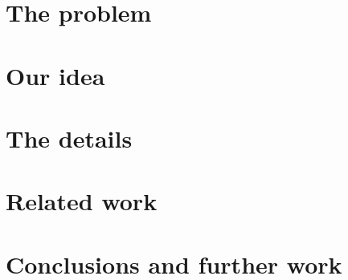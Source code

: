 \section{The problem}  %
  
\section{Our idea}     %
\section{The details}  %
  
\section{Related work} %
  
\section{Conclusions and further work}

